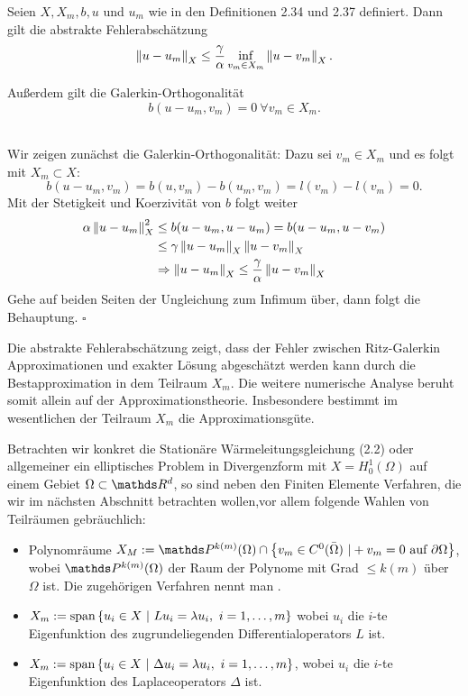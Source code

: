 Seien $X,X_m,b,u$ und $u_m$ wie in den Definitionen 2.34 und 2.37 definiert. 
Dann gilt die abstrakte Fehlerabschätzung
\[
\left\Vert u-u_m\right\Vert_X \le \frac{\gamma}{\alpha} \inf\limits_{v_m\in X_m} \left\Vert u-v_m\right\Vert_X.
\]

Außerdem gilt die Galerkin-Orthogonalität
\[
b(u-u_m,v_m)=0~\forall v_m\in X_m.
\]

\\
Wir zeigen zunächst die Galerkin-Orthogonalität:
Dazu sei $v_m\in X_m$ und es folgt mit $X_m\subset X$:
\[
b(u-u_m,v_m) = b(u,v_m)-b(u_m,v_m) = l(v_m)-l(v_m)= 0.
\]
Mit der Stetigkeit und Koerzivität von $b$ folgt weiter
\begin{align*}
\alpha \left\Vert u-u_m\right\Vert_X^2 &\le b(u-u_m,u-u_m) = b(u-u_m,u-v_m)\\
&\le \gamma\left\Vert u-u_m\right\Vert_X\left\Vert u-v_m\right\Vert_X\\
&\Rightarrow \left\Vert u-u_m\right\Vert_X \le \frac{\gamma}{\alpha} \left\Vert u-v_m\right\Vert_X
\end{align*}
Gehe auf beiden Seiten der Ungleichung zum Infimum über, dann folgt die Behauptung.
\hfill $\square$

Die abstrakte Fehlerabschätzung zeigt, dass der Fehler zwischen Ritz-Galerkin Approximationen und exakter Lösung abgeschätzt werden kann durch die Bestapproximation in dem Teilraum $X_m$.
Die weitere numerische Analyse beruht somit allein auf der Approximationstheorie.
Insbesondere bestimmt im wesentlichen der Teilraum $X_m$ die Approximationsgüte.

Betrachten wir konkret die Stationäre Wärmeleitungsgleichung (2.2) oder allgemeiner ein elliptisches Problem in Divergenzform mit $X=H^1_0(\Omega)$ auf einem Gebiet $\Omega\subset \R^d$, so sind neben den Finiten Elemente Verfahren, die wir im nächsten Abschnitt betrachten wollen,vor allem folgende Wahlen von Teilräumen gebräuchlich:
\begin{itemize}
	\item Polynomräume $X_M := \Pw^{k(m)}(\Omega)\cap \penbrace{v_m\in C^0(\bar{\Omega})~|+v_m=0\text{ auf }\partial\Omega}$, wobei $\Pw^{k(m)}(\Omega)$ der Raum der Polynome mit Grad $\le k(m)$ über $\Omega$ ist.
	Die zugehörigen Verfahren nennt man .
	\item $X_m := \operatorname{span} \left\{u_i\in X~|~Lu_i=\lambda u_i,~i=1, \dots ,m\right\}$ wobei $u_i$ die $i$-te Eigenfunktion des zugrundeliegenden Differentialoperators $L$ ist.
	\item $X_m := \operatorname{span} \left\{u_i\in X~|~ \Delta u_i =\lambda u_i,~i=1, \dots ,m\right\}$, wobei $u_i$ die $i$-te Eigenfunktion des Laplaceoperators $\Delta$ ist.
\end{itemize}

